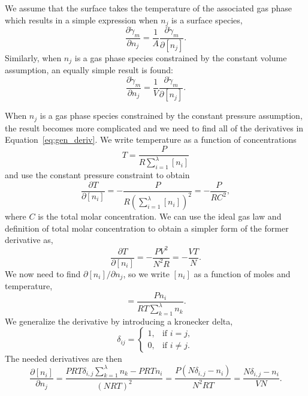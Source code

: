 \documentclass{article}
\def\gasspecies{\lambda}
\begin{document}
We assume that the surface takes the temperature of the associated gas phase which
results in a simple expression when $n_j$ is a surface species,
\begin{equation}
    \frac{\partial \dot{\gamma}_m}{\partial n_j} =  \frac{1}{A}\frac{\partial \dot{\gamma}_m}{\partial [n_j]}.
\end{equation}
Similarly, when $n_j$ is a gas phase species constrained by the constant volume assumption, an equally simple result is found:
\begin{equation}
    \frac{\partial \dot{\gamma}_m}{\partial n_j} =  \frac{1}{V}\frac{\partial \dot{\gamma}_m}{\partial [n_j]}.
\end{equation}

When $n_j$ is a gas phase species constrained by the constant pressure assumption, the result becomes more complicated and we need to find all of the derivatives in Equation~\ref{eq:gen_deriv}.
We write temperature as a function of concentrations
\begin{equation}
    T = \frac{P}{R\sum_{i=1}^{\gasspecies}[n_i]}
\end{equation}
and use the constant pressure constraint to obtain
\begin{equation}
    \frac{\partial T}{\partial [n_i]} = -\frac{P}{R(\sum_{i=1}^{\gasspecies}[n_i])^{2}} = -\frac{P}{RC^{2}},
\end{equation}
where $C$ is the total molar concentration.
We can use the ideal gas law and definition of total molar concentration to obtain a simpler form of the former derivative as,
\begin{equation}
    \frac{\partial T}{\partial [n_i]}  = -\frac{P V^2}{N^2 R} = -\frac{VT}{N}.
\end{equation}
We now need to find $\partial [n_i] / \partial n_j$, so we write $[n_i]$ as a function of moles and temperature,
\begin{equation}
    [n_i] = \frac{P n_i}{R T \sum_{k=1}^{\gasspecies} n_k}.
\end{equation}
We generalize the derivative by introducing a kronecker delta,
\begin{equation}
    \delta_{ij} =
    \begin{cases}
            1, &         \text{if } i=j,\\
            0, &         \text{if } i\neq j.
    \end{cases}
\end{equation}
The needed derivatives are then
\begin{equation}
    \frac{\partial [n_i]}{\partial n_j} = \frac{P R T \delta_{i,j} \sum_{k=1}^{\gasspecies}{n_k} - P R T n_i}{(NRT)^2} = \frac{P(N\delta_{i,j}-n_i)}{N^2RT} = \frac{N\delta_{i,j}-n_i}{V N}.
\end{equation}
\end{document}

